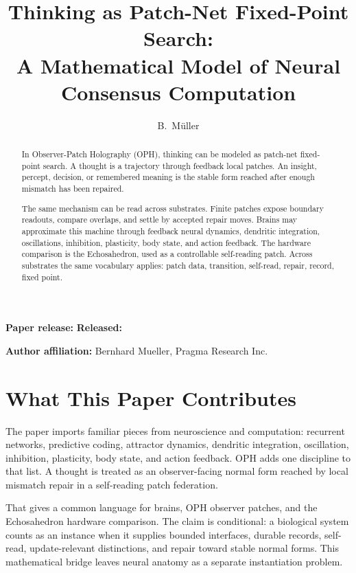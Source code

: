 \documentclass[11pt]{article}
\title{Thinking as Patch-Net Fixed-Point Search:\\
A Mathematical Model of Neural Consensus Computation}
\author{B.\ M\"uller}
\date{}
\theoremstyle{remark}
\theoremstyle{plain}
\begin{document}
\maketitle
\begin{center}
\small\textbf{Paper release:} \OPHPaperReleaseID\quad
\textbf{Released:} \OPHPaperReleaseDate
\end{center}

\begin{center}
\small\textbf{Author affiliation:} Bernhard Mueller, Pragma Research Inc.
\end{center}

\begin{abstract}
In Observer-Patch Holography (OPH), thinking can be modeled as patch-net
fixed-point search. A thought is a trajectory through feedback local patches.
An insight, percept, decision, or remembered meaning is the stable form reached
after enough mismatch has been repaired.

The same mechanism can be read across substrates. Finite patches expose boundary readouts, compare overlaps, and settle by accepted repair moves. Brains may approximate this machine through feedback neural dynamics, dendritic integration, oscillations, inhibition, plasticity, body state, and action feedback. The hardware comparison is the Echosahedron, used as a controllable self-reading patch. Across substrates the same vocabulary applies: patch data, transition, self-read, repair, record, fixed point.
\end{abstract}



\section*{What This Paper Contributes}

The paper imports familiar pieces from neuroscience and computation: recurrent
networks, predictive coding, attractor dynamics, dendritic integration,
oscillation, inhibition, plasticity, body state, and action feedback. OPH adds
one discipline to that list. A thought is treated as an observer-facing normal
form reached by local mismatch repair in a self-reading patch federation.

That gives a common language for brains, OPH observer patches, and the
Echosahedron hardware comparison. The claim is conditional: a biological
system counts as an instance when it supplies bounded interfaces, durable
records, self-read, update-relevant distinctions, and repair toward stable
normal forms. This mathematical bridge leaves neural anatomy as a separate
instantiation problem.
\end{document}

